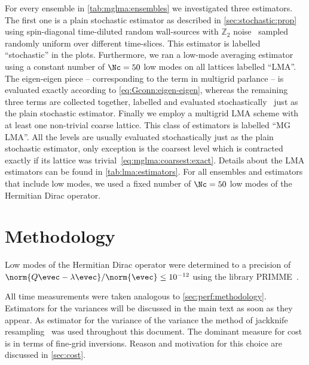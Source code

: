 For every ensemble in \cref{tab:mglma:ensembles} we investigated three estimators.
The first one is a plain stochastic estimator as described in \cref{sec:stochastic:prop} using spin-diagonal time-diluted random wall-sources with $\mathbb{Z}_2$ noise~\cite{ETM:2008zte} sampled randomly uniform over different time-slices.
This estimator is labelled ``stochastic'' in the plots.
Furthermore, we ran a low-mode averaging estimator using a constant number of $\Nc=50$ low modes on all lattices labelled ``LMA''.
The eigen-eigen piece -- corresponding to the  term in multigrid parlance -- is evaluated exactly according to \cref{eq:Gconn:eigen-eigen}, whereas the remaining three terms are collected together, labelled  and evaluated stochastically~\cite{lynch2023} just as the plain stochastic estimator.
Finally we employ a multigrid LMA scheme with at least one non-trivial coarse lattice.
This class of estimators is labelled ``MG LMA''.
All the levels are usually evaluated stochastically just as the plain stochastic estimator, only exception is the coarsest level which is contracted exactly if its lattice was trivial~\cref{eq:mglma:coarsest:exact}.
Details about the LMA estimators can be found in \cref{tab:lma:estimators}.
For all ensembles and estimators that include low modes, we used a fixed number of $\Nc=50$ low modes of the Hermitian Dirac operator.

\section{Methodology}
\label{sec:numerics:methodology}

Low modes of the Hermitian Dirac operator were determined to a precision of $\norm{Q \evec - \lambda \evec} / \norm{\evec} \leq 10^{-12}$ using the library PRIMME~\cite{primme}.


All time measurements were taken analogous to \cref{sec:perf:methodology}.
Estimators for the variances will be discussed in the main text as soon as they appear.
As estimator for the variance of the variance the method of jackknife resampling~\cite{efron1982jackknife,shao2012jackknife} was used throughout this document.
The dominant measure for cost is in terms of fine-grid inversions.
Reason and motivation for this choice are discussed in \cref{sec:cost}.


